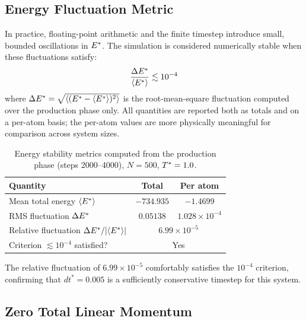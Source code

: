 \subsection{Energy Fluctuation Metric}

In practice, floating-point arithmetic and the finite timestep introduce
small, bounded oscillations in $E^{*}$. The simulation is considered
numerically stable when these fluctuations satisfy:
\begin{equation}
    \frac{\Delta E^{*}}{\langle E^{*} \rangle} \lesssim 10^{-4}
    \label{eq:fluct_criterion}
\end{equation}
where $\Delta E^{*} = \sqrt{\langle (E^{*} - \langle E^{*} \rangle)^2 \rangle}$
is the root-mean-square fluctuation computed over the production phase only.
All quantities are reported both as totals and on a per-atom basis; the
per-atom values are more physically meaningful for comparison across
system sizes.

\begin{table}[H]
    \centering
    \caption{Energy stability metrics computed from the production phase
    (steps 2000--4000), $N = 500$, $T^{*} = 1.0$.}
    \label{tab:diag_energy}
    \begin{tabular}{lcc}
        \toprule
        \textbf{Quantity} & \textbf{Total} & \textbf{Per atom} \\
        \midrule
        Mean total energy $\langle E^{*} \rangle$                      & $-734.935$  & $-1.4699$ \\
        RMS fluctuation $\Delta E^{*}$                                 & $0.05138$   & $1.028 \times 10^{-4}$ \\
        Relative fluctuation $\Delta E^{*} / |\langle E^{*} \rangle|$ & \multicolumn{2}{c}{$6.99 \times 10^{-5}$} \\
        Criterion $\lesssim 10^{-4}$ satisfied?                         & \multicolumn{2}{c}{Yes} \\
        \bottomrule
    \end{tabular}
\end{table}

The relative fluctuation of $6.99 \times 10^{-5}$ comfortably satisfies
the $10^{-4}$ criterion, confirming that $dt^* = 0.005$ is a
sufficiently conservative timestep for this system.
\subsection{Zero Total Linear Momentum}

